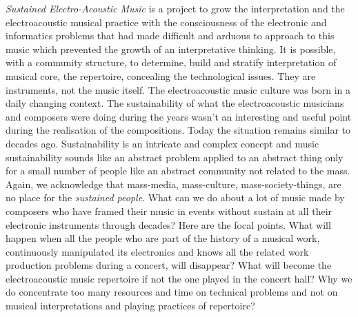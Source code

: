 \documentclass[
	a0,
	portrait
	]{a0poster}
\begin{document}
\noindent \emph{Sustained Electro-Acoustic Music} is a project to grow the interpretation and the electroacoustic musical practice with the consciousness of the electronic and informatics problems that had made difficult and arduous to approach to this music which prevented the growth of an interpretative thinking. It is possible, with a community structure, to determine, build and stratify interpretation of musical core, the repertoire, concealing the technological issues. They are instruments, not the music itself. The electroacoustic music culture was born in a daily changing context. The sustainability of what the electroacoustic musicians and composers were doing during the years wasn't an interesting and useful point during the realisation of the compositions. Today the situation remains similar to decades ago. Sustainability is an intricate and complex concept and music sustainability sounds like an abstract problem applied to an abstract thing only for a small number of people like an abstract community not related to the mass. Again, we acknowledge that mass-media, mass-culture, mass-society-things, are no place for the \emph{sustained people}. What can we do about a lot of music made by composers who have framed their music in events without sustain at all their electronic instruments through decades? Here are the focal points. What will happen when all the people who are part of the history of a musical work, continuously manipulated its electronics and knows all the related work production problems during a concert, will disappear? What will become the electroacoustic music repertoire if not the one played in the concert hall? Why we do concentrate too many resources and time on technical problems and not on musical interpretations and playing practices of repertoire?

\normalsize

\end{document}
